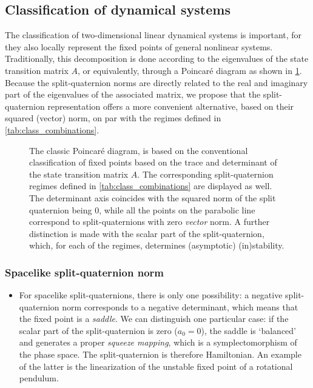 \subsection{Classification of dynamical systems}
\label{ssec:system_classification}
The classification of two-dimensional linear dynamical systems is important, for they also locally represent the fixed points of general nonlinear systems. Traditionally, this decomposition is done according to the eigenvalues of the state transition matrix \(A\), or equivalently, through a Poincaré diagram as shown in \cref{fig:poincare_diagram}. Because the split-quaternion norms are directly related to the real and imaginary part of the eigenvalues of the associated matrix, we propose that the split-quaternion representation offers a more convenient alternative, based on their squared (vector) norm, on par with the regimes defined in \cref{tab:class_combinations}.
\begin{figure}[ht!]
    \centering
    
    \caption{The classic Poincaré diagram, is based on the conventional classification of fixed points based on the trace and determinant of the state transition matrix \(A\). The corresponding split-quaternion regimes defined in \cref{tab:class_combinations} are displayed as well. The determinant axis coincides with the squared norm of the split quaternion being 0, while all the points on the parabolic line correspond to split-quaternions with zero \emph{vector} norm. A further distinction is made with the scalar part of the split-quaternion, which, for each of the regimes, determines (asymptotic) (in)stability.}
    \label{fig:poincare_diagram}
\end{figure}

\subsubsection*{Spacelike split-quaternion norm}
    \begin{itemize}
        \item[\circled{1}] For spacelike split-quaternions, there is only one possibility: a negative split-quaternion norm corresponds to a negative determinant, which means that the fixed point is a \emph{saddle}. We can distinguish one particular case: if the scalar part of the split-quaternion is zero (\(a_0 = 0\)), the saddle is `balanced' and generates a proper \emph{squeeze mapping}, which is a symplectomorphism of the phase space. The split-quaternion is therefore Hamiltonian. An example of the latter is the linearization of the unstable fixed point of a rotational pendulum.
    \end{itemize}

